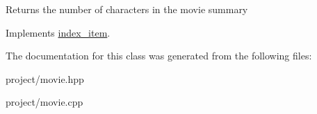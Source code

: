 Returns the number of characters in the movie summary 

Implements \hyperlink{classindex__item_ae8ccce55ab973b1a2faa99df65e19051}{index\+\_\+item}.



The documentation for this class was generated from the following files\+:\begin{DoxyCompactItemize}
\item 
project/movie.\+hpp\item 
project/movie.\+cpp\end{DoxyCompactItemize}
